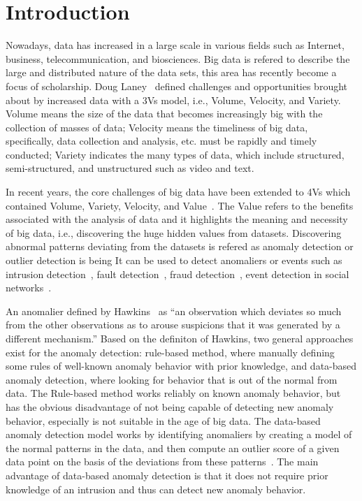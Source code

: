 \section{Introduction}\label{sec-intro}

Nowadays,
data has increased in a large scale
in various fields such as Internet,
business,
telecommunication,
and biosciences.
Big data is refered to describe
the large and distributed
nature of the data sets,
this area has recently become a focus of scholarship.
Doug Laney~\cite{laney01controlling3v} defined challenges
and opportunities brought about by increased data
with a 3Vs model,
i.e., Volume,
Velocity,
and Variety.
Volume means the size of the data that becomes increasingly big
with the collection of masses of data;
Velocity means the timeliness of big data,
specifically,
data collection and analysis,
etc. must be rapidly and timely conducted;
Variety indicates the many types of data,
which include structured,
semi-structured,
and unstructured such as video and text.

In recent years,
the core challenges of big data
have been extended to 4Vs which
contained Volume,
Variety,
Velocity,
and Value~\cite{gantz2011extracting}.
The Value refers to the benefits associated with
the analysis of data and it highlights
the meaning and necessity of big data,
i.e.,
discovering the huge hidden values from datasets.
Discovering abnormal patterns
deviating from the
datasets is refered as anomaly detection or outlier detection
is being
It can be used to detect anomaliers or
events such as
intrusion detection~\cite{garcia2009anomaly},
fault detection~\cite{hwang2009survey},
fraud detection~\cite{bolton2002statistical},
event detection in social networks~\cite{sakaki2010earthquake}.




An anomalier defined by Hawkins~\cite{hawkins1980identification}
as ``an observation which
deviates so much from the other observations
as to arouse suspicions that
it was generated by a different mechanism.''
Based on the definiton of Hawkins,
two general approaches exist for the anomaly
detection:
rule-based method,
where manually defining some rules of
well-known anomaly behavior
with prior knowledge,
and data-based anomaly detection,
where looking for behavior that
is out of the normal from data.
The Rule-based method works
reliably on known anomaly behavior,
but has the obvious disadvantage of
not being capable of
detecting new anomaly behavior,
especially is not suitable in the age of big data.
The data-based anomaly detection model works by
identifying anomaliers by creating a model of
the normal patterns in the data,
and then compute an outlier score of
a given data point on the basis of
the deviations from these patterns~\cite{chandola2009anomaly}.
The main advantage of data-based anomaly detection is that
it does not require prior knowledge of
an intrusion and thus can detect new anomaly behavior.

